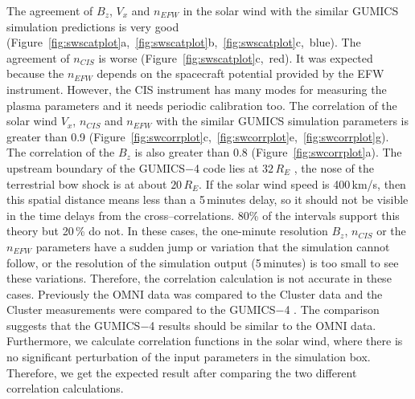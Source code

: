 \documentclass[draft]{agujournal2019}
\begin{document}
The agreement of $B_{z}$, $V_{x}$ and $n_{EFW}$ in the solar wind with the similar GUMICS simulation predictions is very good (Figure~\ref{fig:swscatplot}a,~\ref{fig:swscatplot}b,~\ref{fig:swscatplot}c,~blue). The agreement of $n_{CIS}$ is worse (Figure~\ref{fig:swscatplot}c,~red). It was expected because the $n_{EFW}$ depends on the spacecraft potential provided by the EFW instrument. However, the CIS instrument has many modes for measuring the plasma parameters and it needs periodic calibration too. The correlation of the solar wind $V_{x}$, $n_{CIS}$ and $n_{EFW}$ with the similar GUMICS simulation parameters is greater than 0.9 (Figure~\ref{fig:swcorrplot}c,~\ref{fig:swcorrplot}e,~\ref{fig:swcorrplot}g). The correlation of the $B_{z}$ is also greater than 0.8 (Figure~\ref{fig:swcorrplot}a). The upstream boundary of the GUMICS$-$4 code lies at $32\,R_E$ \cite{janhunen12:_gumic_mhd}, the nose of the terrestrial bow shock is at about $20\,R_E$. If the solar wind speed is 400\,km/s, then this spatial distance means less than a 5\,minutes delay, so it should not be visible in the time delays from the cross--correlations. 80\% of the intervals support this theory but 20\,\% do not. In these cases, the one-minute resolution $B_z$, $n_{CIS}$ or the $n_{EFW}$ parameters have a sudden jump or variation that the simulation cannot follow, or the resolution of the simulation output (5\,minutes) is too small to see these variations. Therefore, the correlation calculation is not accurate in these cases. Previously the OMNI data was compared to the Cluster data and the Cluster measurements were compared to the GUMICS$-$4 \cite{facsko16:_one_earth}. The comparison suggests that the GUMICS$-$4 results should be similar to the OMNI data. Furthermore, we calculate correlation functions in the solar wind, where there is no significant perturbation of the input parameters in the simulation box. Therefore, we get the expected result after comparing the two different correlation calculations.
\end{document}
